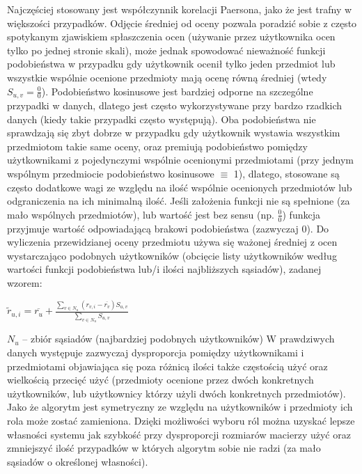 \documentclass{pracamgr}
\begin{document}
    Najczęściej stosowany jest współczynnik korelacji Paersona, jako że jest trafny w większości przypadków.
    Odjęcie średniej od oceny pozwala poradzić sobie z często spotykanym zjawiskiem spłaszczenia ocen (używanie przez użytkownika ocen tylko po jednej stronie skali),
    może jednak spowodować nieważność funkcji podobieństwa w przypadku gdy użytkownik ocenił tylko jeden przedmiot
    lub wszystkie wspólnie ocenione przedmioty mają ocenę równą średniej (wtedy $S_{u,v}=\frac{0}{0}$).
    Podobieństwo kosinusowe jest bardziej odporne na szczególne przypadki w danych,
    dlatego jest często wykorzystywane przy bardzo rzadkich danych (kiedy takie przypadki często występują).
    Oba podobieństwa nie sprawdzają się zbyt dobrze w przypadku gdy użytkownik wystawia wszystkim przedmiotom takie same oceny,
    oraz premiują podobieństwo pomiędzy użytkownikami z pojedynczymi wspólnie ocenionymi przedmiotami (przy jednym wspólnym przedmiocie podobieństwo kosinusowe $\equiv$ 1),
    dlatego, stosowane są często dodatkowe wagi ze względu na ilość wspólnie ocenionych przedmiotów lub odgraniczenia na ich minimalną ilość.
    Jeśli założenia funkcji nie są spełnione (za mało wspólnych przedmiotów), lub wartość jest bez sensu (np. $\frac{0}{0}$)
    funkcja przyjmuje wartość odpowiadającą brakowi podobieństwa (zazwyczaj 0).\newline\newline
    Do wyliczenia przewidzianej oceny przedmiotu używa się ważonej średniej z ocen wystarczająco podobnych użytkowników
    (obcięcie listy użytkowników według wartości funkcji podobieństwa lub/i ilości najbliższych sąsiadów), zadanej wzorem:\newline
    \begin{center}
     $\tilde{r}_{u,i}=\overline{r_{u}}+\frac{\sum\limits_{v\in N_u}(r_{v,i}-\overline{r_v})S_{u,v}}{\sum\limits_{v\in N_u}S_{u,v}}$
    \end{center}
    {\scriptsize
     $N_u$ -- zbiór sąsiadów (najbardziej podobnych użytkowników)
    }\newline\newline
    W prawdziwych danych występuje zazwyczaj dysproporcja pomiędzy użytkownikami i przedmiotami objawiająca się poza różnicą ilości także
    częstością użyć oraz wielkością przecięć użyć (przedmioty ocenione przez dwóch konkretnych użytkowników,
    lub użytkownicy którzy użyli dwóch konkretnych przedmiotów).
    Jako że algorytm jest symetryczny ze względu na użytkowników i przedmioty ich rola może zostać zamieniona.    
    Dzięki możliwości wyboru ról można uzyskać lepsze własności systemu jak szybkość przy dysproporcji rozmiarów macierzy użyć oraz zmniejszyć
    ilość przypadków w których algorytm sobie nie radzi (za mało sąsiadów o określonej własności).
\end{document}

